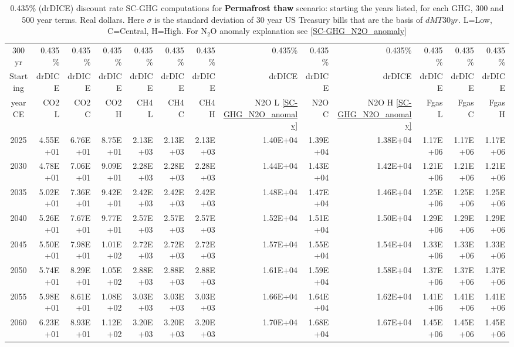 \documentclass{article}
\begin{document}
\begin{table}
      \caption{0.435\% (drDICE) discount rate  SC-GHG computations for \textbf{Permafrost thaw} scenario: starting the years listed, for each GHG, 300 and 500 year terms. Real dollars. Here $\sigma$ is the standard deviation of 30 year US Treasury bills that are the basis of $dMT30yr$. L=Low, C=Central, H=High. For N$_2$O anomaly explanation see \ref{SC-GHG_N2O_anomaly}} 
\label{PVs_300_yearSCC_S0.435}
\small
\begin{tabular}{crrr|rrr|rrr|rrr}
300 yr   & 0.435\%  & 0.435\%  & 0.435\%  & 0.435\%  & 0.435\%  & 0.435\%  & 0.435\%  & 0.435\%  & 0.435\%  & 0.435\%  & 0.435\%  & 0.435\%  \\
Starting & drDICE   & drDICE   & drDICE   & drDICE   & drDICE   & drDICE   & drDICE   & drDICE   & drDICE   & drDICE   & drDICE   & drDICE   \\
year CE  & CO2 L    & CO2 C    & CO2 H    & CH4 L    & CH4 C    & CH4 H    & N2O L \ref{SC-GHG_N2O_anomaly}     & N2O C      & N2O H \ref{SC-GHG_N2O_anomaly}    & Fgas L   & Fgas C   & Fgas H   \\
2025     & 4.55E+01 & 6.76E+01 & 8.75E+01 & 2.13E+03 & 2.13E+03 & 2.13E+03 & 1.40E+04 & 1.39E+04 & 1.38E+04 & 1.17E+06 & 1.17E+06 & 1.17E+06 \\
2030     & 4.78E+01 & 7.06E+01 & 9.09E+01 & 2.28E+03 & 2.28E+03 & 2.28E+03 & 1.44E+04 & 1.43E+04 & 1.42E+04 & 1.21E+06 & 1.21E+06 & 1.21E+06 \\
2035     & 5.02E+01 & 7.36E+01 & 9.42E+01 & 2.42E+03 & 2.42E+03 & 2.42E+03 & 1.48E+04 & 1.47E+04 & 1.46E+04 & 1.25E+06 & 1.25E+06 & 1.25E+06 \\
2040     & 5.26E+01 & 7.67E+01 & 9.77E+01 & 2.57E+03 & 2.57E+03 & 2.57E+03 & 1.52E+04 & 1.51E+04 & 1.50E+04 & 1.29E+06 & 1.29E+06 & 1.29E+06 \\
2045     & 5.50E+01 & 7.98E+01 & 1.01E+02 & 2.72E+03 & 2.72E+03 & 2.72E+03 & 1.57E+04 & 1.55E+04 & 1.54E+04 & 1.33E+06 & 1.33E+06 & 1.33E+06 \\
2050     & 5.74E+01 & 8.29E+01 & 1.05E+02 & 2.88E+03 & 2.88E+03 & 2.88E+03 & 1.61E+04 & 1.59E+04 & 1.58E+04 & 1.37E+06 & 1.37E+06 & 1.37E+06 \\
2055     & 5.98E+01 & 8.61E+01 & 1.08E+02 & 3.03E+03 & 3.03E+03 & 3.03E+03 & 1.66E+04 & 1.64E+04 & 1.62E+04 & 1.41E+06 & 1.41E+06 & 1.41E+06 \\
2060     & 6.23E+01 & 8.93E+01 & 1.12E+02 & 3.20E+03 & 3.20E+03 & 3.20E+03 & 1.70E+04 & 1.68E+04 & 1.67E+04 & 1.45E+06 & 1.45E+06 & 1.45E+06 \\

\end{tabular}
\end{table}
\end{document}
